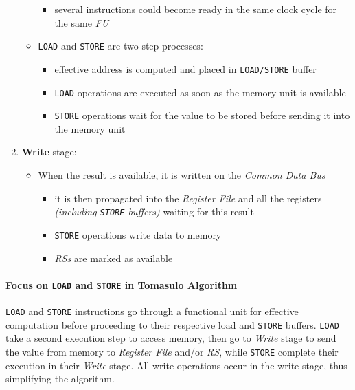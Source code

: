 \documentclass[english]{article}
\begin{document}
\begin{enumerate}
\begin{itemize}
\begin{itemize}
                  \item several instructions could become ready in the same clock cycle for the same \textit{FU}
                \end{itemize}
          \item \texttt{LOAD} and \texttt{STORE} are two-step processes:
                \begin{itemize}
                  \item effective address is computed and placed in \texttt{LOAD/STORE} buffer
                  \item \texttt{LOAD} operations are executed as soon as the memory unit is available
                  \item \texttt{STORE} operations wait for the value to be stored before sending it into the memory unit
                \end{itemize}
        \end{itemize}
  \item \textbf{Write} stage:
        \begin{itemize}
          \item When the result is available, it is written on the \textit{Common Data Bus}
                \begin{itemize}
                  \item it is then propagated into the \textit{Register File} and all the registers \textit{(including \texttt{STORE} buffers)} waiting for this result
                  \item \texttt{STORE} operations write data to memory
                  \item \textit{RSs} are marked as available
                \end{itemize}
        \end{itemize}
\end{enumerate}

\paragraph{Focus on \texttt{LOAD} and \texttt{STORE} in Tomasulo Algorithm}

\texttt{LOAD} and \texttt{STORE} instructions go through a functional unit for effective computation before proceeding to their respective load and \texttt{STORE} buffers.
\texttt{LOAD} take a second execution step to access memory, then go to \textit{Write} stage to send the value from memory to \textit{Register File} and/or \textit{RS}, while \texttt{STORE} complete their execution in their \textit{Write} stage.
All write operations occur in the write stage, thus simplifying the algorithm.
\end{document}
